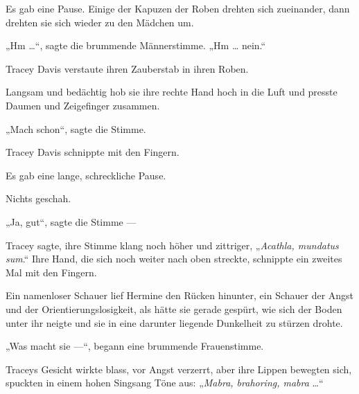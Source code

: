 Es gab eine Pause. Einige der Kapuzen der Roben drehten sich zueinander, dann drehten sie sich wieder zu den Mädchen um.

„Hm …“, sagte die brummende Männerstimme.
„Hm … nein.“

Tracey Davis verstaute ihren Zauberstab in ihren Roben.

Langsam und bedächtig hob sie ihre rechte Hand hoch in die Luft und presste Daumen und Zeigefinger zusammen.

„Mach schon“, sagte die Stimme.

Tracey Davis schnippte mit den Fingern.

Es gab eine lange, schreckliche Pause.

Nichts geschah.

„Ja, gut“, sagte die Stimme —

Tracey sagte, ihre Stimme klang noch höher und zittriger,
„\emph{Acathla, mundatus sum}.“ Ihre Hand, die sich noch weiter nach oben streckte, schnippte ein zweites Mal mit den Fingern.

Ein namenloser Schauer lief Hermine den Rücken hinunter, ein Schauer der Angst und der Orientierungslosigkeit, als hätte sie gerade gespürt, wie sich der Boden unter ihr neigte und sie in eine darunter liegende Dunkelheit zu stürzen drohte.

„Was macht sie —“, begann eine brummende Frauenstimme.

Traceys Gesicht wirkte blass, vor Angst verzerrt, aber ihre Lippen bewegten sich, spuckten in einem hohen Singsang Töne aus:
„\emph{Mabra, brahoring, mabra} …“


